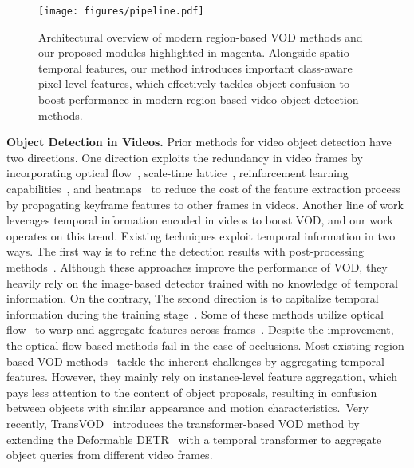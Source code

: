 \documentclass[10pt,twocolumn,letterpaper]{article}
\begin{document}
\begin{figure*}
\begin{center}
\texttt{[image: figures/pipeline.pdf]}
\caption{Architectural overview of modern region-based VOD methods and our proposed modules highlighted in magenta. Alongside spatio-temporal features, our method introduces important class-aware pixel-level features, which effectively tackles object confusion to boost performance in modern region-based video object detection methods.}
\label{fig:pipeline}
\end{center}
\vspace{-20pt}
\end{figure*}

\vspace{3pt}
\noindent \textbf{Object Detection in Videos.}
\label{sec:rel_vod}
Prior methods for video object detection have two directions. One direction exploits the redundancy in video frames by incorporating optical flow~\cite{zhu2017deep, zhu2018towards}, scale-time lattice~\cite{chen2018optimizing}, reinforcement learning capabilities~\cite{yao2020video}, and heatmaps~\cite{xu2020centernet} to reduce the cost of the feature extraction process by propagating keyframe features to other frames in videos. Another line of work leverages temporal information encoded in videos to boost VOD, and our work operates on this trend. Existing techniques exploit temporal information in two ways. The first way is to refine the detection results with post-processing methods~\cite{han2016seq, kang2016object, kang2017t}. Although these approaches improve the performance of VOD, they heavily rely on the image-based detector trained with no knowledge of temporal information.
On the contrary, The second direction is to capitalize temporal information during the training stage~\cite{zhu2017flow, wang2018fully, feichtenhofer2017detect, bertasius2018object, guo2019progressive, shvets2019leveraging, wu2019sequence, deng2019relation, zhu2017deep, zhu2018towards, chen2018optimizing, xiao2018video, deng2019object, tang2019object,chen2020joint,chen2020memory, gong2021temporal, zhou2022transvod}. Some of these methods utilize optical flow~\cite{dosovitskiy2015flownet} to warp and aggregate features across frames~\cite{zhu2017flow, wang2018fully,kang2017t}. Despite the improvement, the optical flow based-methods fail in the case of occlusions. Most existing region-based VOD methods~\cite{zhu2017flow, zhu2017flow, wu2019sequence, gong2021temporal} tackle the inherent challenges by aggregating temporal features. However, they mainly rely on instance-level feature aggregation, which pays less attention to the content of object proposals, resulting in confusion between objects with similar appearance and motion characteristics.~Very recently, TransVOD~\cite{zhou2022transvod} introduces the transformer-based VOD method by extending the Deformable DETR~\cite{zhu2020deformable} with a temporal transformer to aggregate object queries from different video frames.
\end{document}
